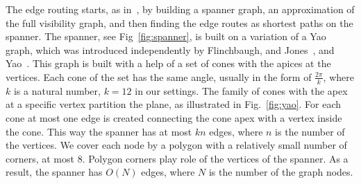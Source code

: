 \documentclass{gd-llncs}
\begin{document}
The edge routing starts, as in~\cite{dwyer2010fast}, by building a spanner graph, an approximation of the full visibility graph,
and then finding the edge routes as shortest paths on the spanner. The spanner, see Fig~\ref{fig:spanner}, is built on a variation of a Yao graph, which was introduced independently by Flinchbaugh, and Jones~\cite{flinchbaugh1981strong}, and Yao~\cite{yao1982constructing}. This graph is built with a help of a set of cones with the apices at the vertices. Each cone of the set has the same angle,
usually in the form of $\frac{2\pi} {k}$, where $k$ is a natural number, $k = 12$ in our settings.
The family of cones with the apex at a specific vertex partition the plane, as illustrated in Fig.~\ref{fig:yao}. For each cone at most one edge is created connecting the cone apex with a vertex inside the cone. This way the spanner has at most $kn$ edges, where $n$ is the number of the vertices. We cover each node by a polygon with a relatively small number of corners, at most $8$. Polygon corners play role of the vertices of the spanner. As a result, the spanner has $O(N)$ edges, where $N$ is the number of the graph nodes.\\
\end{document}
